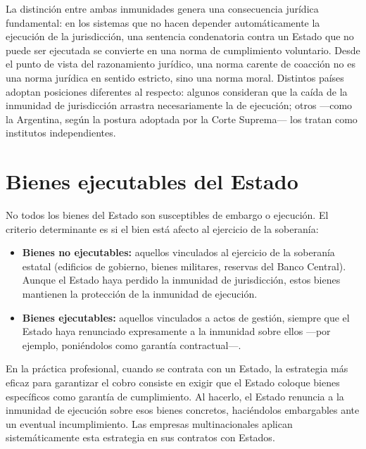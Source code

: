 \documentclass[12pt,oneside]{book}
\begin{document}
\begin{important}
La distinción entre ambas inmunidades genera una consecuencia jurídica fundamental: en los sistemas que no hacen depender automáticamente la ejecución de la jurisdicción, una sentencia condenatoria contra un Estado que no puede ser ejecutada se convierte en una norma de cumplimiento voluntario. Desde el punto de vista del razonamiento jurídico, una norma carente de coacción no es una norma jurídica en sentido estricto, sino una norma moral. Distintos países adoptan posiciones diferentes al respecto: algunos consideran que la caída de la inmunidad de jurisdicción arrastra necesariamente la de ejecución; otros —como la Argentina, según la postura adoptada por la Corte Suprema— los tratan como institutos independientes.
\end{important}

\section{Bienes ejecutables del Estado}

No todos los bienes del Estado son susceptibles de embargo o ejecución. El criterio determinante es si el bien está afecto al ejercicio de la soberanía:

\begin{itemize}
    \item \textbf{Bienes no ejecutables:} aquellos vinculados al ejercicio de la soberanía estatal (edificios de gobierno, bienes militares, reservas del Banco Central). Aunque el Estado haya perdido la inmunidad de jurisdicción, estos bienes mantienen la protección de la inmunidad de ejecución.
    \item \textbf{Bienes ejecutables:} aquellos vinculados a actos de gestión, siempre que el Estado haya renunciado expresamente a la inmunidad sobre ellos —por ejemplo, poniéndolos como garantía contractual—.
\end{itemize}

\begin{important}
En la práctica profesional, cuando se contrata con un Estado, la estrategia más eficaz para garantizar el cobro consiste en exigir que el Estado coloque bienes específicos como garantía de cumplimiento. Al hacerlo, el Estado renuncia a la inmunidad de ejecución sobre esos bienes concretos, haciéndolos embargables ante un eventual incumplimiento. Las empresas multinacionales aplican sistemáticamente esta estrategia en sus contratos con Estados.
\end{important}
\end{document}
